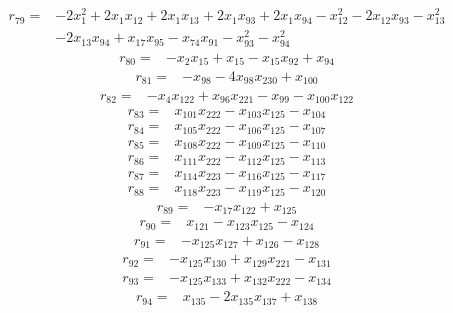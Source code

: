 \[\begin{aligned}
r_{79}={}&-2x_{1}^{2}+2x_{1}x_{12}+2x_{1}x_{13}+2x_{1}x_{93}+2x_{1}x_{94}-x_{12}^{2}-2x_{12}x_{93}-x_{13}^{2}
\\ &-2x_{13}x_{94}+x_{17}x_{95}-x_{74}x_{91}-x_{93}^{2}-x_{94}^{2}
\end{aligned}\]
\[\begin{aligned}
r_{80}={}&-x_{2}x_{15}+x_{15}-x_{15}x_{92}+x_{94}
\end{aligned}\]
\[\begin{aligned}
r_{81}={}&-x_{98}-4x_{98}x_{230}+x_{100}
\end{aligned}\]
\[\begin{aligned}
r_{82}={}&-x_{4}x_{122}+x_{96}x_{221}-x_{99}-x_{100}x_{122}
\end{aligned}\]
\[\begin{aligned}
r_{83}={}&x_{101}x_{222}-x_{103}x_{125}-x_{104}
\end{aligned}\]
\[\begin{aligned}
r_{84}={}&x_{105}x_{222}-x_{106}x_{125}-x_{107}
\end{aligned}\]
\[\begin{aligned}
r_{85}={}&x_{108}x_{222}-x_{109}x_{125}-x_{110}
\end{aligned}\]
\[\begin{aligned}
r_{86}={}&x_{111}x_{222}-x_{112}x_{125}-x_{113}
\end{aligned}\]
\[\begin{aligned}
r_{87}={}&x_{114}x_{223}-x_{116}x_{125}-x_{117}
\end{aligned}\]
\[\begin{aligned}
r_{88}={}&x_{118}x_{223}-x_{119}x_{125}-x_{120}
\end{aligned}\]
\[\begin{aligned}
r_{89}={}&-x_{17}x_{122}+x_{125}
\end{aligned}\]
\[\begin{aligned}
r_{90}={}&x_{121}-x_{123}x_{125}-x_{124}
\end{aligned}\]
\[\begin{aligned}
r_{91}={}&-x_{125}x_{127}+x_{126}-x_{128}
\end{aligned}\]
\[\begin{aligned}
r_{92}={}&-x_{125}x_{130}+x_{129}x_{221}-x_{131}
\end{aligned}\]
\[\begin{aligned}
r_{93}={}&-x_{125}x_{133}+x_{132}x_{222}-x_{134}
\end{aligned}\]
\[\begin{aligned}
r_{94}={}&x_{135}-2x_{135}x_{137}+x_{138}
\end{aligned}\]

